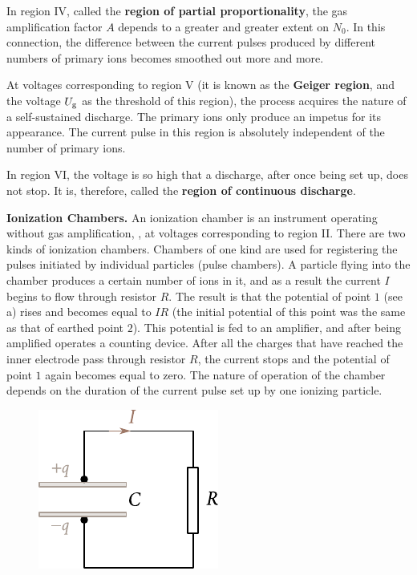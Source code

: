 In region IV, called the \textbf{region of partial proportionality}, the gas amplification factor $A$ depends to a greater and greater extent on $N_0$.
In this connection, the difference between the current pulses produced by different numbers of primary ions becomes smoothed out more and more.

At voltages corresponding to region V (it is known as the \textbf{Geiger region}, and the voltage $U_{\text{g}}$ as the threshold of this region), the process acquires the nature of a self-sustained discharge.
The primary ions only produce an impetus for its appearance.
The current pulse in this region is absolutely independent of the number of primary ions.

In region VI, the voltage is so high that a discharge, after once being set up, does not stop.
It is, therefore, called the \textbf{region of continuous discharge}.

\textbf{Ionization Chambers.} An ionization chamber is an instrument operating without gas amplification, \ie, at voltages corresponding to region II.
There are two kinds of ionization chambers.
Chambers of one kind are used for registering the pulses initiated by individual particles (pulse chambers).
A particle flying into the chamber produces a certain number of ions in it, and as a result the current $I$ begins to flow through resistor $R$.
The result is that the potential of point $1$ (see a) rises and becomes equal to $IR$ (the initial potential of this point was the same as that of earthed point $2$).
This potential is fed to an amplifier, and after being amplified operates a counting device.
After all the charges that have reached the inner electrode pass through resistor $R$, the current stops and the potential of point $1$ again becomes equal to zero.
The nature of operation of the chamber depends on the duration of the current pulse set up by one ionizing particle.

\begin{figure}[t]
	\begin{center}
		\includegraphics[scale=1]{figures/ch_12/fig_12_5.pdf}
		\caption[]{}
		\label{fig:12_5}
	\end{center}
	\vspace{-0.8cm}
\end{figure}

